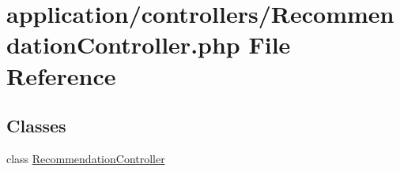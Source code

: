 \hypertarget{_recommendation_controller_8php}{\section{application/controllers/\-Recommendation\-Controller.php File Reference}
\label{_recommendation_controller_8php}
}
\subsection*{Classes}
\begin{DoxyCompactItemize}
\item 
class \hyperlink{class_recommendation_controller}{Recommendation\-Controller}
\end{DoxyCompactItemize}
